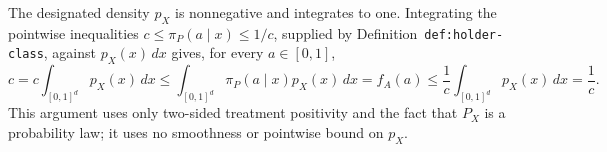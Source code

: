 The designated density \(p_X\) is nonnegative and integrates to one. Integrating the pointwise inequalities \(c\le\pi_P(a\mid x)\le1/c\), supplied by Definition~\texttt{def:holder-class}, against \(p_X(x)\,dx\) gives, for every \(a\in[0,1]\),
\[
c=c\int_{[0,1]^d}p_X(x)\,dx
\le\int_{[0,1]^d}\pi_P(a\mid x)p_X(x)\,dx
=f_A(a)
\le\frac1c\int_{[0,1]^d}p_X(x)\,dx
=\frac1c.
\]
This argument uses only two-sided treatment positivity and the fact that \(P_X\) is a probability law; it uses no smoothness or pointwise bound on \(p_X\).